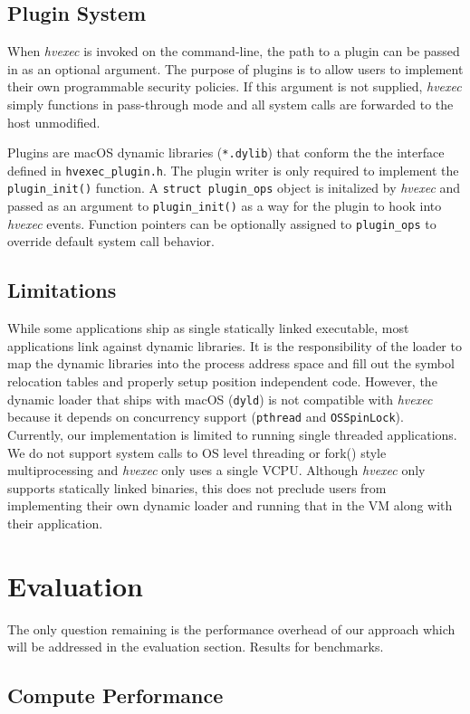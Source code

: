 \documentclass{article}
\newcommand{\PROJNAME}{\textit{hvexec}}
\begin{document}
\subsection{Plugin System}
When \PROJNAME{} is invoked on the command-line, the path to a plugin can be passed in as an optional argument.
The purpose of plugins is to allow users to implement their own programmable security policies.
If this argument is not supplied, \PROJNAME{} simply functions in pass-through mode and all system calls are forwarded to the host unmodified.

Plugins are macOS dynamic libraries (\texttt{*.dylib}) that conform the the interface defined in \texttt{hvexec\_plugin.h}.
The plugin writer is only required to implement the \texttt{plugin\_init()} function.
A \texttt{struct plugin\_ops} object is initalized by \PROJNAME{} and passed as an argument to \texttt{plugin\_init()} as a way for the plugin to hook into \PROJNAME{} events.
Function pointers can be optionally assigned to \texttt{plugin\_ops} to override default system call behavior.

\subsection{Limitations}
While some applications ship as single statically linked executable, most applications link against dynamic libraries.
It is the responsibility of the loader to map the dynamic libraries into the process address space and fill out the
symbol relocation tables and properly setup position independent code.
However, the dynamic loader that ships with macOS (\texttt{dyld}) is not compatible with \PROJNAME{} because it depends on concurrency support (\texttt{pthread} and \texttt{OSSpinLock}).
Currently, our implementation is limited to running single threaded applications.
We do not support system calls to OS level threading or fork() style multiprocessing and \PROJNAME{} only uses a single VCPU.
Although \PROJNAME{} only supports statically linked binaries, this does not preclude users from implementing their own dynamic loader and running that in the VM along with their application.


\section{Evaluation}
The only question remaining is the performance overhead of our approach which will be
addressed in the evaluation section.
Results for benchmarks.
\subsection{Compute Performance}
\end{document}
